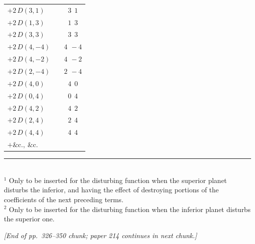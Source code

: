 \documentclass[12pt,a4paper]{article}
\theoremstyle{plain}
\begin{document}
\begin{center}
\begin{tabular}{|l|c|c|}
$+2\,D(3,1)$                                              &        & $3\ \ 1$ \\
$+2\,D(1,3)$                                              &        & $1\ \ 3$ \\
$+2\,D(3,3)$                                              &        & $3\ \ 3$ \\
$+2\,D(4,-4)$                                             &        & $4\ \,-4$ \\
$+2\,D(4,-2)$                                             &        & $4\ \,-2$ \\
$+2\,D(2,-4)$                                             &        & $2\ \,-4$ \\
$+2\,D(4,0)$                                              &        & $4\ \ 0$ \\
$+2\,D(0,4)$                                              &        & $0\ \ 4$ \\
$+2\,D(4,2)$                                              &        & $4\ \ 2$ \\
$+2\,D(2,4)$                                              &        & $2\ \ 4$ \\
$+2\,D(4,4)$                                              &        & $4\ \ 4$ \\
$+\&\mathrm{c.,\ \&c.}$                                   &        &           \\
\hline
\end{tabular}
\end{center}

\medskip
\noindent\rule{6cm}{0.4pt}\\[0.3em]
\noindent\small $^{1}$ Only to be inserted for the disturbing function when the superior planet disturbs the inferior, and having the effect of destroying portions of the coefficients of the next preceding terms.\\
$^{2}$ Only to be inserted for the disturbing function when the inferior planet disturbs the superior one.

\bigskip

\noindent\textit{[End of pp.~326--350 chunk; paper 214 continues in next chunk.]}
\end{document}
